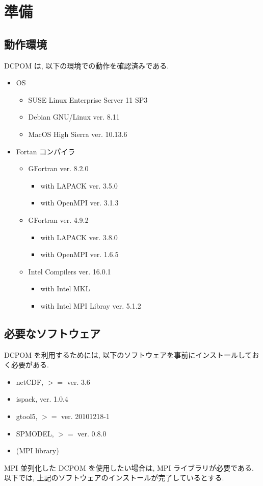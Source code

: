 \section{準備}

\subsection{動作環境}

DCPOM は, 以下の環境での動作を確認済みである.
\begin{itemize}
\item OS
  \begin{itemize}
    \item SUSE Linux Enterprise Server 11 SP3
    \item Debian GNU/Linux ver. 8.11
    \item MacOS High Sierra ver. 10.13.6
  \end{itemize}
\item Fortan コンパイラ
\begin{itemize}
  \item GFortran ver. 8.2.0
  \begin{itemize}  
    \item with LAPACK ver. 3.5.0
    \item with OpenMPI ver. 3.1.3  
  \end{itemize}
  \item GFortran ver. 4.9.2
  \begin{itemize}  
    \item with LAPACK ver. 3.8.0
    \item with OpenMPI ver. 1.6.5  
  \end{itemize}  
  \item Intel \textsuperscript \textregistered Compilers ver. 16.0.1
  \begin{itemize}  
    \item with Intel \textsuperscript \textregistered MKL
    \item with Intel \textsuperscript \textregistered MPI Libray ver. 5.1.2
  \end{itemize}  
\end{itemize}
\end{itemize}

\subsection{必要なソフトウェア}

DCPOM を利用するためには, 以下のソフトウェアを事前にインストールしてお
く必要がある.
\begin{itemize}
  \item netCDF, $>=$ ver. 3.6
  \item ispack, ver. 1.0.4
  \item gtool5, $>=$ ver. 20101218-1
  \item SPMODEL, $>=$ ver. 0.8.0
  \item (MPI library)
  
\end{itemize} 
MPI 並列化した DCPOM を使用したい場合は, MPI ライブラリが必要である. 
以下では, 上記のソフトウェアのインストールが完了しているとする. 

